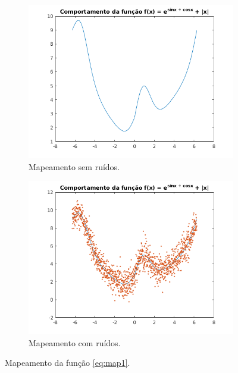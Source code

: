 	\begin{figure}[h!]
	
	\centering
	
		\begin{subfigure}{.5\textwidth} 
		  \centering
		  \includegraphics[width=1\linewidth]{aproximacao/sem_ruidos_y_fx}
		  \caption{\centering Mapeamento sem ruídos.} 
		  \label{fig:map1_s_ruido} 
		  
		\end{subfigure}%
		\begin{subfigure}{.5\textwidth}
		  \centering
		  \includegraphics[width=1\linewidth]{aproximacao/com_ruidos_y_fx}
		  \caption{\centering Mapeamento com ruídos.}
		  \label{fig:map1_c_ruido} 
		\end{subfigure}
	
	
	\caption{Mapeamento da função \ref{eq:map1}.}
	\end{figure}
	
